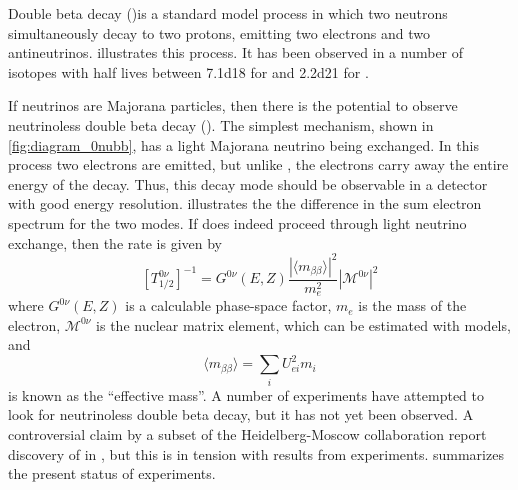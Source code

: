 \documentclass[herrin-thesis.tex]{subfiles}
\begin{document}
Double beta decay (\twonu)is a standard model process in which two neutrons simultaneously decay to two protons, emitting two electrons and two antineutrinos.  illustrates this process. It has been observed in a number of isotopes with half lives between \SI{7.1d18}{\year} for \cite{Arnold:2005hc} and \SI{2.2d21}{\year} for \cite{Auger:2012ar}.

If neutrinos are Majorana particles, then there is the potential to observe neutrinoless double beta decay (\zeronu). The simplest mechanism, shown in \cref{fig:diagram_0nubb}, has a light Majorana neutrino being exchanged. In this process two electrons are emitted, but unlike \twonu, the electrons carry away the entire energy of the decay. Thus, this decay mode should be observable in a detector with good energy resolution.  illustrates the the difference in the sum electron spectrum for the two modes. If \zeronu does indeed proceed through light neutrino exchange, then the rate is given by
\begin{equation}
\left [ T^{0\nu}_{1/2} \right ]^{-1} = G^{0\nu}\left(E, Z\right)\frac{\left | \langle m_{\beta\beta} \rangle \right |^2}{m_e^2}\left | \mathcal{M}^{0\nu}\right |^2
\label{eq:nu_zeronu_rate}
\end{equation}
where \(G^{0\nu}(E,Z)\) is a calculable phase-space factor, \(m_e\) is the mass of the electron, \( \mathcal{M}^{0\nu}\) is the nuclear matrix element, which can be estimated with models, and
\begin{equation}
\langle m_{\beta\beta} \rangle = \sum_i U_{e i}^2 m_i
\label{eq:nu_meff_def}
\end{equation}
is known as the ``effective mass''. A number of experiments have attempted to look for neutrinoless double beta decay, but it has not yet been observed. A controversial claim by a subset of the Heidelberg-Moscow collaboration report discovery of \zeronu in \cite{KlapdorKleingrothaus:2006ff}, but this is in tension with results from  experiments\cite{Auger:2012ar}\cite{Gando:2013fk}.  summarizes the present status of experiments.
\end{document}
